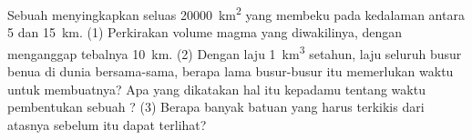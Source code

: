 \begin{exercise}[$\star\star\star$]\label{exo:g12:subduction-magmatism:15}
Sebuah  menyingkapkan  seluas \qty{20000}{km^2} yang
 membeku pada kedalaman antara 5 dan \qty{15}{km}.
(1) Perkirakan volume magma yang diwakilinya, dengan menganggap tebalnya
\qty{10}{km}. (2) Dengan laju \qty{1}{km^3} setahun, laju seluruh busur benua
di dunia bersama-sama, berapa lama busur-busur itu memerlukan waktu untuk
membuatnya? Apa yang dikatakan hal itu kepadamu tentang waktu pembentukan
sebuah ?
(3) Berapa banyak batuan yang harus terkikis dari atasnya sebelum  itu
dapat terlihat?
\end{exercise}

